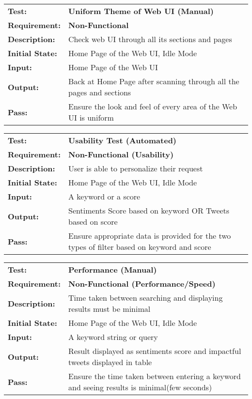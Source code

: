 \documentclass{article}
\begin{document}
	\begin{mdframed}[linewidth=1pt]%
	\begin{tabularx}{\textwidth}{@{}p{3cm}X@{}}
	{\bf Test:} & {\bf Uniform Theme of Web UI  (Manual)}\\[\baselineskip]
	{\bf Requirement:} & {\bf Non-Functional}\\[\baselineskip]
	{\bf Description:} & Check web UI through all its sections and pages\\[0.5\baselineskip]
	{\bf Initial State:} &  Home Page of the Web UI, Idle Mode\\[0.5\baselineskip]
	{\bf Input:} &  Home Page of the Web UI\\[0.5\baselineskip]
	{\bf Output:} & Back at Home Page after scanning through all the pages and sections\\[0.5\baselineskip]
	{\bf Pass:} & Ensure the look and feel of every area of the Web UI is uniform
	\end{tabularx}
	\end{mdframed}

	\begin{mdframed}[linewidth=1pt]%
	\begin{tabularx}{\textwidth}{@{}p{3cm}X@{}}
	{\bf Test:} & {\bf Usability Test (Automated)}\\[\baselineskip]
	{\bf Requirement:} & {\bf Non-Functional (Usability)}\\[\baselineskip]
	{\bf Description:} & User is able to personalize their request\\[0.5\baselineskip]
	{\bf Initial State:} &  Home Page of the Web UI, Idle Mode\\[0.5\baselineskip]
	{\bf Input:} &  A keyword or a score\\[0.5\baselineskip]
	{\bf Output:} & Sentiments Score based on keyword OR Tweets based on score \\[0.5\baselineskip]
	{\bf Pass:} & Ensure appropriate data is provided for the two types of filter based on keyword and score
	\end{tabularx}
	\end{mdframed}


	\begin{mdframed}[linewidth=1pt] %
	\begin{tabularx}{\textwidth}{@{}p{3cm}X@{}}
	{\bf Test:} & {\bf Performance (Manual)}\\[\baselineskip]
	{\bf Requirement:} & {\bf Non-Functional (Performance/Speed)}\\[\baselineskip]
	{\bf Description:} & Time taken between searching and displaying results must be minimal\\[0.5\baselineskip]
	{\bf Initial State:} &  Home Page of the Web UI, Idle Mode\\[0.5\baselineskip]
	{\bf Input:} &  A keyword string or query\\[0.5\baselineskip]
	{\bf Output:} & Result displayed as sentiments score and impactful tweets displayed in table\\[0.5\baselineskip]
	{\bf Pass:} & Ensure the time taken between entering a keyword and seeing results is minimal(few seconds)
	\end{tabularx}
	\end{mdframed}
	
\end{document}
